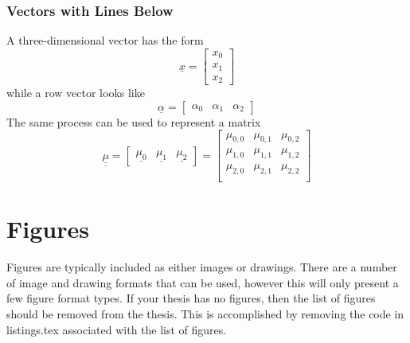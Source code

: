 \subsubsection{Vectors with Lines Below}
    A three-dimensional vector has the form
    \begin{equation}
        \underline{x}
            =\begin{bmatrix}
                x_0 \\ x_1 \\ x_2
             \end{bmatrix}
    \end{equation}
    while a row vector looks like
    \begin{equation}
        \underline{\alpha}
            =\begin{bmatrix}
                \alpha_0 & \alpha_1 & \alpha_2
             \end{bmatrix}
    \end{equation}
    The same process can be used to represent a matrix
    \begin{equation}
        \underline{\underline{\mu}}
            =\begin{bmatrix}
                \underline{\mu_0} & \underline{\mu_1} & \underline{\mu_2}
             \end{bmatrix}
            =\begin{bmatrix}
                \mu_{0,0} & \mu_{0,1} & \mu_{0,2} \\
                \mu_{1,0} & \mu_{1,1} & \mu_{1,2} \\
                \mu_{2,0} & \mu_{2,1} & \mu_{2,2} \\
             \end{bmatrix}
    \end{equation}

\section{Figures} \label{sec:Figures}
    Figures are typically included as either images or drawings.
    There are a number of image and drawing formats that can be used, however this will only present a few figure format types.
    If your thesis has no figures, then the list of figures should be removed from the thesis.
    This is accomplished by removing the code in listings.tex associated with the list of figures.

